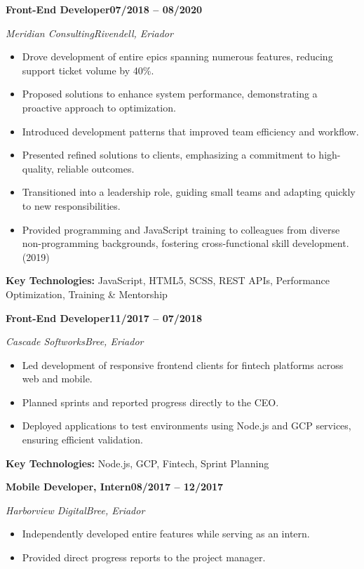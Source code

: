\documentclass[letterpaper,11pt]{article}
\newlength{\cventrysep}\setlength{\cventrysep}{6pt}  %
\newcommand{\cventry}[4]{%
  \noindent\normalsize\textbf{#1}\hfill\small\textbf{#4}\par
  \nopagebreak[4]
  \noindent\normalsize\textit{\textcolor{accent}{#2}}\hfill\small\textit{#3}\par
  \nopagebreak[4]
}
\newcommand{\keytech}[1]{\small\textbf{Key Technologies:} #1\par}
\begin{document}
\vspace{\cventrysep}

\cventry{Front-End Developer}{Meridian Consulting}{Rivendell, Eriador}{07/2018 -- 08/2020}
\begin{itemize}\small
    \item Drove development of entire epics spanning numerous features, reducing support ticket volume by 40\%.
    \item Proposed solutions to enhance system performance, demonstrating a proactive approach to optimization.
    \item Introduced development patterns that improved team efficiency and workflow.
    \item Presented refined solutions to clients, emphasizing a commitment to high-quality, reliable outcomes.
    \item Transitioned into a leadership role, guiding small teams and adapting quickly to new responsibilities.
    \item Provided programming and JavaScript training to colleagues from diverse non-programming backgrounds, fostering cross-functional skill development. (2019)
\end{itemize}
\keytech{JavaScript, HTML5, SCSS, REST APIs, Performance Optimization, Training \& Mentorship}

\vspace{\cventrysep}

\cventry{Front-End Developer}{Cascade Softworks}{Bree, Eriador}{11/2017 -- 07/2018}
\begin{itemize}\small
    \item Led development of responsive frontend clients for fintech platforms across web and mobile.
    \item Planned sprints and reported progress directly to the CEO.
    \item Deployed applications to test environments using Node.js and GCP services, ensuring efficient validation.
\end{itemize}
\keytech{Node.js, GCP, Fintech, Sprint Planning}

\vspace{\cventrysep}

\cventry{Mobile Developer, Intern}{Harborview Digital}{Bree, Eriador}{08/2017 -- 12/2017}
\begin{itemize}\small
    \item Independently developed entire features while serving as an intern.
    \item Provided direct progress reports to the project manager.
\end{itemize}
\end{document}
